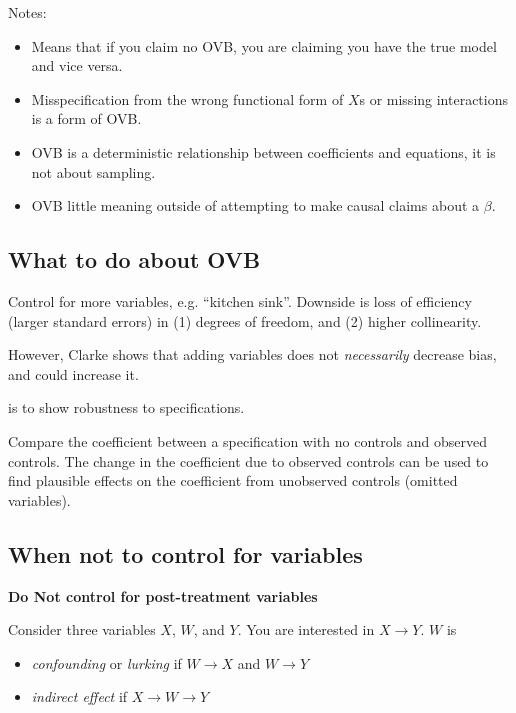 \documentclass{tufte-handout}
\begin{document}
Notes:

\begin{itemize}
\itemsep1pt\parskip0pt
\item
  Means that if you claim no OVB, you are claiming you have the true
  model and vice versa.
\item
  Misspecification from the wrong functional form of \(X\)s or missing
  interactions is a form of OVB.
\item
  OVB is a deterministic relationship between coefficients and
  equations, it is not about sampling.
\item
  OVB little meaning outside of attempting to make causal claims about a
  \(\beta\).
\end{itemize}

\subsection{What to do about OVB}\label{what-to-do-about-ovb}

Control for more variables, e.g. ``kitchen sink''. Downside is loss of
efficiency (larger standard errors) in (1) degrees of freedom, and (2)
higher collinearity.

However, Clarke shows that adding variables does not \emph{necessarily}
decrease bias, and could increase it.

 is to show robustness to specifications.

Compare the coefficient between a specification with no controls and
observed controls. The change in the coefficient due to observed
controls can be used to find plausible effects on the coefficient from
unobserved controls (omitted variables).

\subsection{When not to control for
variables}\label{when-not-to-control-for-variables}

\textbf{Do Not control for post-treatment variables}

Consider three variables \(X\), \(W\), and \(Y\). You are interested in
\(X \to Y\). \(W\) is

\begin{itemize}
\itemsep1pt\parskip0pt
\item
  \emph{confounding} or \emph{lurking} if \(W \to X\) and \(W \to Y\)
\item
  \emph{indirect effect} if \(X \to W \to Y\)
\end{itemize}
\end{document}

